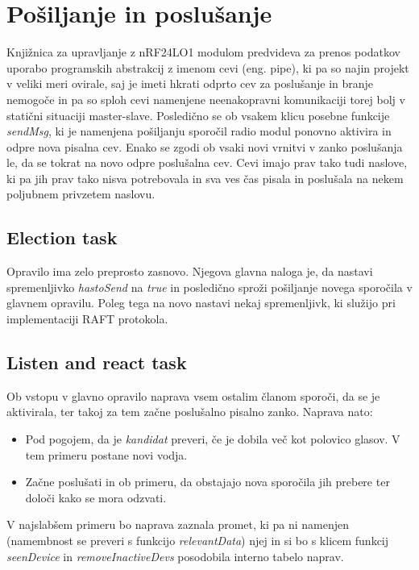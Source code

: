 \documentclass[runningheads]{llncs}
\begin{document}
\section{Pošiljanje in poslušanje}
Knjižnica za upravljanje z nRF24LO1 modulom predvideva za prenos podatkov uporabo programskih abstrakcij z imenom cevi (eng. pipe), ki pa so najin projekt v veliki meri ovirale, saj je imeti hkrati odprto cev za poslušanje in branje nemogoče in pa so sploh cevi namenjene neenakopravni komunikaciji torej bolj v statični situaciji master-slave. Posledično se ob vsakem klicu posebne funkcije \textit{sendMsg}, ki je namenjena pošiljanju sporočil radio modul ponovno aktivira in odpre nova pisalna cev. Enako se zgodi ob vsaki novi vrnitvi v zanko poslušanja le, da se tokrat na novo odpre poslušalna cev. Cevi imajo prav tako tudi naslove, ki pa jih prav tako nisva potrebovala in sva ves čas pisala in poslušala na nekem poljubnem privzetem naslovu. 

\subsection{Election task}
Opravilo ima zelo preprosto zasnovo. Njegova glavna naloga je, da nastavi spremenljivko \textit{hastoSend} na \textit{true} in posledično sproži pošiljanje novega sporočila v glavnem opravilu. Poleg tega na novo nastavi nekaj spremenljivk, ki služijo pri implementaciji RAFT protokola.

\subsection{Listen and react task}
Ob vstopu v glavno opravilo naprava vsem ostalim članom sporoči, da se je aktivirala, ter takoj za tem začne poslušalno pisalno zanko. Naprava nato:

\begin{itemize}
\item Pod pogojem, da je \textit{kandidat} preveri, če je dobila več kot polovico glasov. V tem primeru postane novi vodja.
\item Začne poslušati in ob primeru, da obstajajo nova sporočila jih prebere ter določi kako se mora odzvati.
\end{itemize}
V najslabšem primeru bo naprava zaznala promet, ki pa ni namenjen (namembnost se preveri s funkcijo \textit{relevantData}) njej in si bo s klicem funkcij \textit{seenDevice} in \textit{removeInactiveDevs} posodobila interno tabelo naprav. \\
\end{document}
